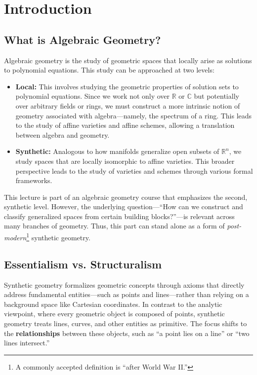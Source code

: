 \chapter{Introduction}\label{chap:introduction}


\section{What is Algebraic Geometry?}

Algebraic geometry is the study of geometric spaces that locally arise as solutions to polynomial equations. This study can be approached at two levels:

\begin{itemize}
  \item \textbf{Local:} This involves studying the geometric properties of solution sets to polynomial equations. Since we work not only over $\mathbb{R}$ or $\mathbb{C}$ but potentially over arbitrary fields or rings, we must construct a more intrinsic notion of geometry associated with algebra—namely, the spectrum of a ring. This leads to the study of affine varieties and affine schemes, allowing a translation between algebra and geometry.

  \item \textbf{Synthetic:} Analogous to how manifolds generalize open subsets of $\mathbb{R}^n$, we study spaces that are locally isomorphic to affine varieties. This broader perspective leads to the study of varieties and schemes through various formal frameworks.
\end{itemize}

This lecture is part of an algebraic geometry course that emphasizes the second, synthetic level. However, the underlying question—“How can we construct and classify generalized spaces from certain building blocks?”—is relevant across many branches of geometry. Thus, this part can stand alone as a form of \emph{post-modern}\footnote{A commonly accepted definition is “after World War II.”} synthetic geometry.

\section{Essentialism vs. Structuralism}

Synthetic geometry formalizes geometric concepts through axioms that directly address fundamental entities—such as points and lines—rather than relying on a background space like Cartesian coordinates. In contrast to the analytic viewpoint, where every geometric object is composed of points, synthetic geometry treats lines, curves, and other entities as primitive. The focus shifts to the \textbf{relationships} between these objects, such as “a point lies on a line” or “two lines intersect.”

